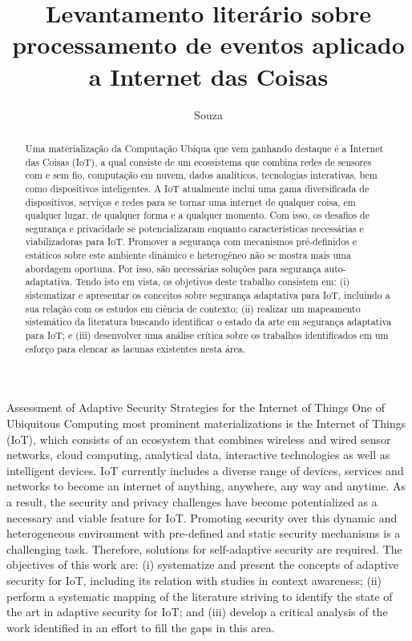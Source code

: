 \documentclass[tid,table]{texufpel} %
\title{Levantamento literário sobre processamento de eventos aplicado a Internet das Coisas}
\author{Souza}{Weslen Schiavon}
\begin{document}
\renewcommand{\coadvisorname}{Coorientadora}      %

\maketitle 

\sloppy



\begin{abstract}
Uma materialização da Computação Ubíqua que vem ganhando destaque é a Internet das Coisas (IoT), a qual consiste de um ecossistema que combina redes de sensores com e sem fio, computação em nuvem, dados analíticos, tecnologias interativas, bem como dispositivos inteligentes. A IoT atualmente inclui uma gama diversificada de dispositivos, serviços e redes para se tornar uma internet de qualquer coisa, em qualquer lugar, de qualquer forma e a qualquer momento. Com isso, os desafios de segurança e privacidade se potencializaram enquanto características necessárias e viabilizadoras para IoT. Promover a segurança com mecanismos pré-definidos e estáticos sobre este ambiente dinâmico e heterogêneo não se mostra mais uma abordagem oportuna. Por isso, são necessárias soluções para segurança auto-adaptativa. Tendo isto em vista, os objetivos deste trabalho consistem em: (i) sistematizar e apresentar os conceitos sobre segurança adaptativa para IoT, incluindo a sua relação com os estudos em ciência de contexto; (ii) realizar um mapeamento sistemático da literatura buscando identificar o estado da arte em segurança adaptativa para IoT; e (iii) desenvolver uma análise crítica sobre os trabalhos identificados em um esforço para elencar as lacunas existentes nesta área.
\end{abstract}


\begin{englishabstract}%
  {Assessment of Adaptive Security Strategies for the Internet of Things}
One of Ubiquitous Computing most prominent materializations is the Internet of Things (IoT), which consists of an ecosystem that combines wireless and wired sensor networks, cloud computing, analytical data, interactive technologies as well as intelligent devices. IoT currently includes a diverse range of devices, services and networks to become an internet of anything, anywhere, any way and anytime. As a result, the security and privacy challenges have become potentialized as a necessary and viable feature for IoT. Promoting security over this dynamic and heterogeneous environment with pre-defined and static security mechanisms is a challenging task. Therefore, solutions for self-adaptive security are required. The objectives of this work are: (i) systematize and present the concepts of adaptive security for IoT, including its relation with studies in context awareness; (ii) perform a systematic mapping of the literature striving to identify the state of the art in adaptive security for IoT; and (iii) develop a critical analysis of the work identified in an effort to fill the gaps in this area.
\end{englishabstract}
\end{document}
